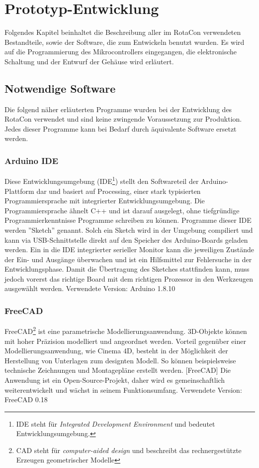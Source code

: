 \documentclass[11pt, titlepage]{report}
\begin{document}
	\chapter{Prototyp-Entwicklung}
	\label{sec:Praxistil}
		Folgendes Kapitel beinhaltet die Beschreibung aller im RotaCon verwendeten Bestandteile, sowie der Software, die zum Entwickeln benutzt wurden.
		Es wird auf die Programmierung des Mikrocontrollers eingegangen, die elektronische Schaltung und der Entwurf der Gehäuse wird erläutert.
		\section{Notwendige Software}
			Die folgend näher erläuterten Programme wurden bei der Entwicklung des RotaCon verwendet und sind keine zwingende Voraussetzung zur Produktion. Jedes dieser Programme kann bei Bedarf durch äquivalente Software ersetzt werden. 
			\subsection*{Arduino IDE}
			\label{sec:Arduino IDE}
				Diese Entwicklungsumgebung (IDE\footnote{IDE steht für \textit{Integrated Development Environment} und bedeutet Entwicklungsumgebung.}) stellt den Softwareteil der Arduino-Plattform dar und basiert auf Processing, einer stark typisierten Programmiersprache mit integrierter Entwicklungsumgebung. Die Programmiersprache ähnelt C++ und ist darauf ausgelegt, ohne tiefgründige Programmierkenntnisse Programme schreiben zu können. Programme dieser IDE werden ''Sketch'' genannt. \newline Solch ein Sketch wird in der Umgebung compiliert und kann via USB-Schnittstelle direkt auf den Speicher des Arduino-Boards geladen werden. Ein in die IDE integrierter serieller Monitor kann die jeweiligen Zustände der Ein- und Ausgänge überwachen und ist ein Hilfsmittel zur Fehlersuche in der Entwicklungsphase.
				\newline Damit die Übertragung des Sketches stattfinden kann, muss jedoch vorerst das richtige Board mit dem richtigen Prozessor in den Werkzeugen ausgewählt werden. Verwendete Version: Arduino 1.8.10
			\subsection*{FreeCAD}
			\label{sec:FreeCAD}
				FreeCAD\footnote{CAD steht für \textit{computer-aided design} und beschreibt das rechnergestützte Erzeugen geometrischer Modelle} ist eine parametrische Modellierungsanwendung. 3D-Objekte können mit hoher Präzision modelliert und angeordnet werden. Vorteil gegenüber einer Modellierungsanwendung, wie Cinema 4D, besteht in der Möglichkeit der Herstellung von Unterlagen zum designten Modell. So können beispielsweise technische Zeichnungen und Montagepläne erstellt werden. [FreeCAD\cite{FreeCAD}] 
				\newline Die Anwendung ist ein Open-Source-Projekt, daher wird es gemeinschaftlich weiterentwickelt und wächst in seinem Funktionsumfang. Verwendete Version: FreeCAD 0.18
			\newpage	
\end{document}
